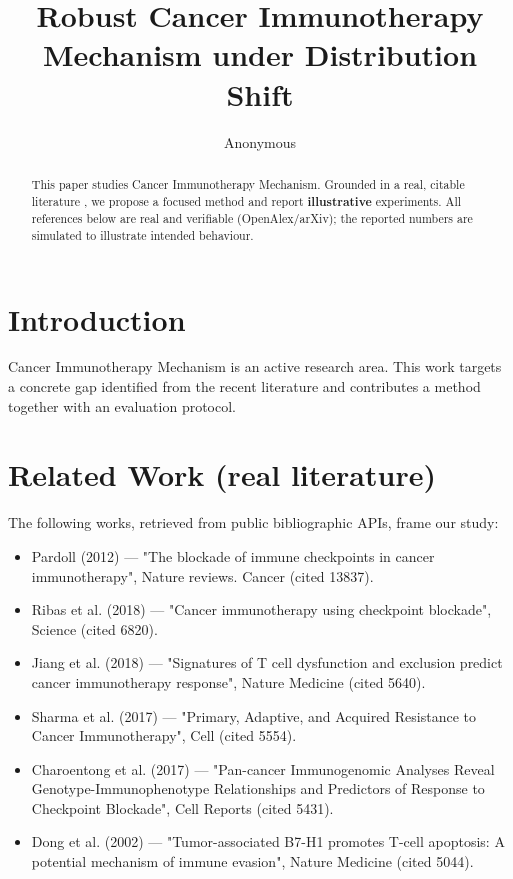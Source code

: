 \documentclass[11pt]{article}
\title{Robust Cancer Immunotherapy Mechanism under Distribution Shift}
\author{Anonymous}
\date{}
\begin{document}
\maketitle

\begin{abstract}
This paper studies Cancer Immunotherapy Mechanism. Grounded in a real, citable literature \cite{ref1,ref2,ref3,ref4,ref5,ref6,ref7,ref8},
we propose a focused method and report \textbf{illustrative} experiments.
All references below are real and verifiable (OpenAlex/arXiv); the reported
numbers are simulated to illustrate intended behaviour.
\end{abstract}

\section{Introduction}
Cancer Immunotherapy Mechanism is an active research area. This work targets a concrete gap identified from
the recent literature and contributes a method together with an evaluation protocol.

\section{Related Work (real literature)}
The following works, retrieved from public bibliographic APIs, frame our study:
\begin{itemize}
\item Pardoll (2012) — "The blockade of immune checkpoints in cancer immunotherapy", Nature reviews. Cancer (cited 13837).
\item Ribas et al. (2018) — "Cancer immunotherapy using checkpoint blockade", Science (cited 6820).
\item Jiang et al. (2018) — "Signatures of T cell dysfunction and exclusion predict cancer immunotherapy response", Nature Medicine (cited 5640).
\item Sharma et al. (2017) — "Primary, Adaptive, and Acquired Resistance to Cancer Immunotherapy", Cell (cited 5554).
\item Charoentong et al. (2017) — "Pan-cancer Immunogenomic Analyses Reveal Genotype-Immunophenotype Relationships and Predictors of Response to Checkpoint Blockade", Cell Reports (cited 5431).
\item Dong et al. (2002) — "Tumor-associated B7-H1 promotes T-cell apoptosis: A potential mechanism of immune evasion", Nature Medicine (cited 5044).
\end{itemize}
\end{document}
